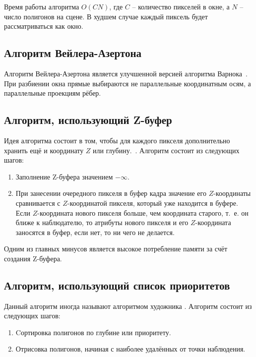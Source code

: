 Время работы алгоритма $O(CN)$, где $C$ -- количество пикселей в окне, а $N$ -- число полигонов на сцене. В худшем случае каждый пиксель будет рассматриваться как окно.

\subsection{Алгоритм Вейлера-Азертона}

Алгоритм Вейлера-Азертона является улучшенной версией алгоритма Варнока~\cite{cannon}. При разбиении окна прямые выбираются не параллельные координатным осям, а параллельные проекциям рёбер.

\subsection{Алгоритм, использующий Z-буфер}

Идея алгоритма состоит в том, чтобы для каждого пикселя дополнительно хранить ещё и координату $Z$ или глубину.~\cite{bands}. Алгоритм состоит из следующих шагов:

\begin{enumerate}[label=\arabic*.]
	\item Заполнение Z-буфера значением $-\infty$.
	\item При занесении очередного пикселя в буфер кадра значение его $Z$-координаты сравнивается с $Z$-координатой пикселя, который уже находится в буфере. Если $Z$-координата нового пикселя больше, чем координата старого, т.~е. он ближе к наблюдателю, то атрибуты нового пикселя и его $Z$-координата заносятся в буфер, если нет, то ни чего не делается. 
\end{enumerate}

Одним из главных минусов является высокое потребление памяти за счёт создания Z-буфера.

\subsection{Алгоритм, использующий список приоритетов}

Данный алгоритм иногда называют алгоритмом художника \cite{parshina}. Алгоритм состоит из следующих шагов:

\begin{enumerate}[label=\arabic*.]
	\item Cортировка полигонов по глубине или приоритету.
	\item Отрисовка полигонов, начиная с наиболее удалённых от точки наблюдения. 
\end{enumerate}

